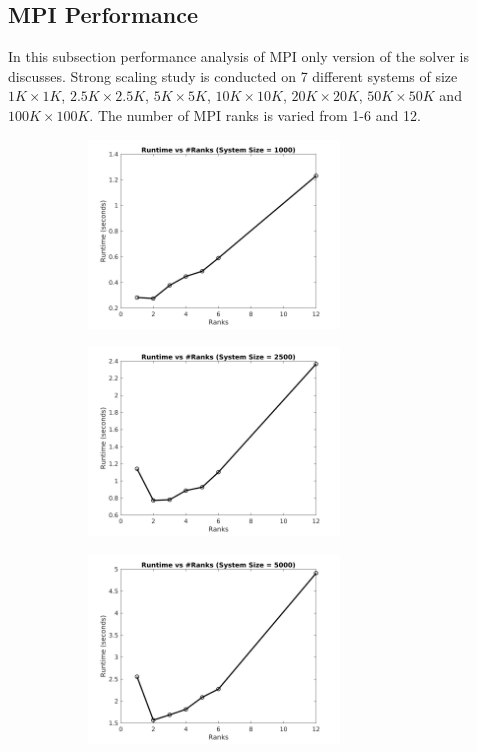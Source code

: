 \documentclass[sigplan,screen]{acmart}
\begin{document}
\subsection{MPI Performance}\label{mpi_perfrom}
In this subsection performance analysis of MPI only version of the solver is discusses. Strong scaling study is conducted on 7 different systems of size $1K\times 1K$, $2.5K\times 2.5K$, $5K\times 5K$, $10K\times 10K$, $20K\times 20K$, $50K\times 50K$ and $100K\times 100K$. The number of MPI ranks is varied from 1-6 and 12. 
\begin{figure}
	\begin{subfigure}{0.4\textwidth}
		\includegraphics[trim= 20 5 35 10,clip, width=0.95\linewidth, height=5cm]{plots/MPI_strong_1k.png} 
		\caption{}
	\end{subfigure}
	\begin{subfigure}{0.4\textwidth}
		\includegraphics[trim= 20 5 35 10,clip, width=0.95\linewidth, height=5cm]{plots/MPI_strong_2k.png}
		\caption{}
	\end{subfigure}
	\begin{subfigure}{0.4\textwidth}
		\includegraphics[trim= 20 5 35 10,clip, width=0.95\linewidth, height=5cm]{plots/MPI_strong_5k.png}

\end{subfigure}
\end{figure}
\end{document}
